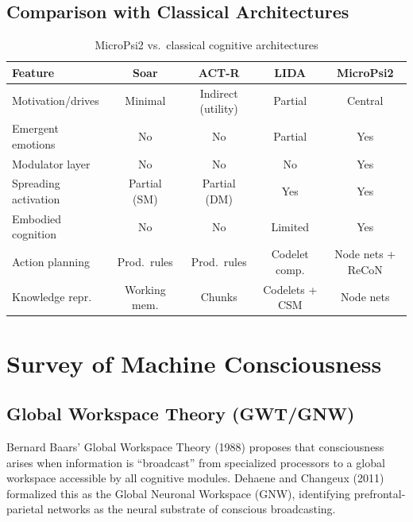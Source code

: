 \documentclass[11pt,letterpaper]{article}
\begin{document}
\subsection{Comparison with Classical Architectures}

\begin{table}[H]
\centering
\small\sffamily
\caption{MicroPsi2 vs.\ classical cognitive architectures}
\label{tab:compare-arch}
\begin{tabularx}{\textwidth}{l c c c c}
\toprule
\textbf{Feature} & \textbf{Soar} & \textbf{ACT-R} & \textbf{LIDA} & \textbf{MicroPsi2} \\
\midrule
Motivation/drives & Minimal & Indirect (utility) & Partial & Central \\
Emergent emotions & No & No & Partial & Yes \\
Modulator layer & No & No & No & Yes \\
Spreading activation & Partial (SM) & Partial (DM) & Yes & Yes \\
Embodied cognition & No & No & Limited & Yes \\
Action planning & Prod.\ rules & Prod.\ rules & Codelet comp. & Node nets + ReCoN \\
Knowledge repr. & Working mem. & Chunks & Codelets + CSM & Node nets \\
\bottomrule
\end{tabularx}
\end{table}

\section{Survey of Machine Consciousness}
\label{sec:survey}

\subsection{Global Workspace Theory (GWT/GNW)}

Bernard Baars' Global Workspace Theory (1988) proposes that consciousness
arises when information is ``broadcast'' from specialized processors to a
global workspace accessible by all cognitive modules. Dehaene and Changeux
(2011) formalized this as the Global Neuronal Workspace (GNW), identifying
prefrontal-parietal networks as the neural substrate of conscious
broadcasting.
\end{document}
